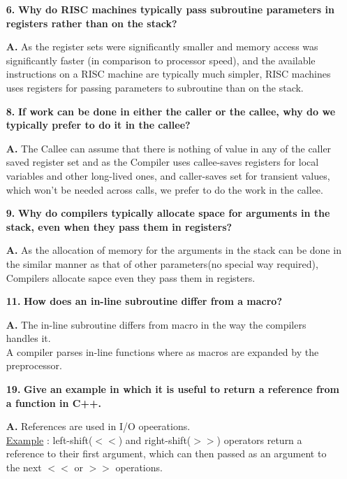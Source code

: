 \documentclass[letterpaper]{article}
\begin{document}
\begin{large}
\begin{flushleft}
\begin{enumerate}
\item[\textbf{6.}]
\textbf{Why do RISC machines typically pass subroutine parameters in registers rather than on the stack?}
\item[\textbf{A.}]
As the register sets were significantly smaller and memory access was significantly faster (in comparison to processor speed), and the available instructions on a RISC machine are typically much simpler, RISC machines uses registers for passing parameters to subroutine than on the stack.

\item[\textbf{8.}]
\textbf{If work can be done in either the caller or the callee, why do we typically prefer to do it in the callee?}
\item[\textbf{A.}]
The Callee can assume that there is nothing of value in any of the caller saved register set and as the Compiler uses callee-saves registers for local variables and other long-lived ones, and caller-saves set for transient values, which won’t be needed across calls, we prefer to do the work in the callee.

\item[\textbf{9.}]
\textbf{Why do compilers typically allocate space for arguments in the stack, even when they pass them in registers?}
\item[\textbf{A.}]
As the allocation of memory for the arguments in the stack can be done in the similar manner as that of other parameters(no special way required), Compilers allocate sapce even they pass them in registers.

\item[\textbf{11.}]
\textbf{How does an in-line subroutine differ from a macro?}
\item[\textbf{A.}]
The in-line subroutine differs from macro in the way the compilers handles it.\\
A compiler parses in-line functions where as macros are expanded by the preprocessor.

\pagebreak

\item[\textbf{19.}]
\textbf{Give an example in which it is useful to return a reference from a function in C++.}
\item[\textbf{A.}]
References are used in I/O opeerations.\\
\underline{Example} : left-shift($<<$) and right-shift($>>$) operators return a reference to their first argument, which can then passed as an argument to the next $<<$ or $>>$ operations.


\end{enumerate}
\end{flushleft}
\end{large}
\end{document}
